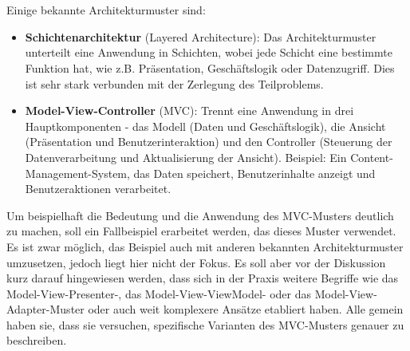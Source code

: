 \documentclass[../vs-script-first-v01.tex]{subfiles}
\begin{document}
\\\\
Einige bekannte Architekturmuster sind:
\begin{itemize}
\item \textbf{Schichtenarchitektur} (Layered Architecture): Das Architekturmuster unterteilt eine Anwendung in Schichten, wobei jede Schicht eine bestimmte Funktion hat, wie z.B. Präsentation, Geschäftslogik oder Datenzugriff. Dies ist sehr stark verbunden mit der Zerlegung des Teilproblems.
\item \textbf{Model-View-Controller} (MVC): Trennt eine Anwendung in drei Hauptkomponenten - das Modell (Daten und Geschäftslogik), die Ansicht (Präsentation und Benutzerinteraktion) und den Controller (Steuerung der Datenverarbeitung und Aktualisierung der Ansicht). Beispiel: Ein Content-Management-System, das Daten speichert, Benutzerinhalte anzeigt und Benutzeraktionen verarbeitet.
\end{itemize}
Um beispielhaft die Bedeutung und die Anwendung des MVC-Musters deutlich zu machen, soll ein Fallbeispiel erarbeitet werden, das dieses Muster verwendet. Es ist zwar möglich, das Beispiel auch mit anderen bekannten Architekturmuster umzusetzen, jedoch liegt hier nicht der Fokus. Es soll aber vor der Diskussion kurz darauf hingewiesen werden, dass sich in der Praxis  weitere Begriffe wie das Model-View-Presenter-, das Model-View-ViewModel- oder das Model-View-Adapter-Muster oder auch weit komplexere Ansätze etabliert haben. Alle gemein haben sie, dass sie versuchen, spezifische Varianten des MVC-Musters genauer zu beschreiben.
\end{document}
